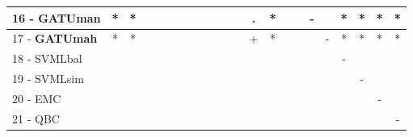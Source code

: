 \begin{table}[h]
\begin{center}
\begin{tabular}{lcc|cc|cc|cc|cc|cc|cc|cc|cc|cc|c}
16 - \textbf{GATUman}	& * & * &   &   &   &   &   &   &   &   &   & . & * &   &   & - &   & * & * & * & * \\ \hline
17 - \textbf{GATUmah}	& * & * &   &   &   &   &   &   &   &   &   & + & * &   &   &   & - & * & * & * & * \\
18 - SVMLbal	&   &   &   &   &   &   &   &   &   &   &   &   &   &   &   &   &   & - &   &   &   \\ \hline
19 - SVMLsim	&   &   &   &   &   &   &   &   &   &   &   &   &   &   &   &   &   &   & - &   &   \\
20 - EMC  	&   &   &   &   &   &   &   &   &   &   &   &   &   &   &   &   &   &   &   & - &   \\ \hline
21 - QBC  	&   &   &   &   &   &   &   &   &   &   &   &   &   &   &   &   &   &   &   &   & - \\\end{tabular}
\label{stratsALCKappaFriedCIELMRedux}
\end{center}
\end{table}
